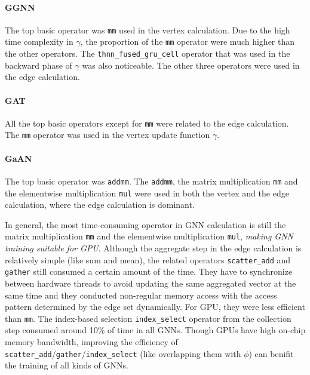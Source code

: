 \paragraph{GGNN}
The top basic operator was \texttt{mm} used in the vertex calculation.
Due to the high time complexity in $\gamma$, the proportion of the \texttt{mm} operator were much higher than the other operators.
The \texttt{thnn\_fused\_gru\_cell} operator that was used in the backward phase of $\gamma$ was also noticeable.
The other three operators were used in the edge calculation.

\paragraph{GAT}
All the top basic operators except for \texttt{mm} were related to the edge calculation.
The \texttt{mm} operator was used in the vertex update function $\gamma$.

\paragraph{GaAN}
The top basic operator was \texttt{addmm}. 
The \texttt{addmm}, the matrix multiplication \texttt{mm} and the elementwise multiplication \texttt{mul} were used in both the vertex and the edge calculation, where the edge calculation is dominant.

In general, the most time-consuming operator in GNN calculation is still the matrix multiplication \texttt{mm} and the elementwise multiplication \texttt{mul}, \emph{making GNN training suitable for GPU}.
Although the aggregate step in the edge calculation is relatively simple (like sum and mean), the related operators \texttt{scatter\_add} and \texttt{gather} still consumed a certain amount of the time.
They have to synchronize between hardware threads to avoid updating the same aggregated vector at the same time and they conducted non-regular memory access with the access pattern determined by the edge set dynamically.
For GPU, they were less efficient than \texttt{mm}.
The index-based selection \texttt{index\_select} operator from the collection step consumed around 10\% of time in all GNNs.
Though GPUs have high on-chip memory bandwidth, improving the efficiency of \texttt{scatter\_add}/\texttt{gather}/\texttt{index\_select} (like overlapping them with $\phi$) can benifit the training of all kinds of GNNs.

